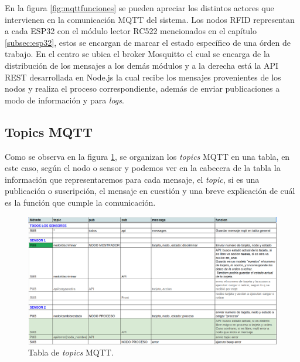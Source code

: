 En la figura \ref{fig:mqttfunciones} se pueden apreciar los distintos actores que intervienen en la comunicación MQTT del sistema. Los nodos RFID representan a cada ESP32 con el módulo lector RC522 mencionados en el capítulo \ref{subsec:esp32}, estos se encargan de marcar el estado específico de una órden de trabajo. En el centro se ubica el broker Mosquitto el cual se encarga de la distribución de los mensajes a los demás módulos y a la derecha está la API REST desarrollada en Node.js la cual recibe los mensajes provenientes de los nodos y realiza el proceso correspondiente, además de enviar publicaciones a modo de información y para \textit{logs}.

\subsection{Topics MQTT}
\label{subsec:mqtttopics}

Como se observa en la figura \ref{fig:mqtttopics}, se organizan los \textit{topics} MQTT en una tabla, en este caso, según el nodo o sensor y podemos ver en la cabecera de la tabla la información que representaremos para cada mensaje, el \textit{topic}, si es una publicación o suscripción, el mensaje en cuestión y una breve explicación de cuál es la función que cumple la comunicación.

\begin{figure}[H]
	\centering
	\includegraphics[scale=.30]{./Figures/mqtt-topics.png}
	\caption{Tabla de \textit{topics} MQTT.}
	\label{fig:mqtttopics}
\end{figure}

